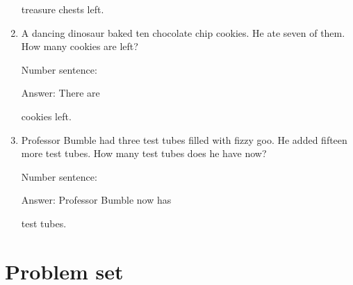 \documentclass{tufte-book}
\begin{document}
\begin{enumerate}
  treasure chests left.
\item
  A dancing dinosaur baked ten chocolate chip cookies. He ate seven of
  them. How many cookies are left?\medskip\par
  Number sentence:
  \dotfill\medskip\par
  Answer: There are
  \dotfill\medskip\par\mbox{}\dotfill\medskip\par\mbox{}\dotfill\bigskip
  cookies left.
\item
  Professor Bumble had three test tubes filled with fizzy goo. He added
  fifteen more test tubes. How many test tubes does he have now?\medskip\par
  Number sentence:
  \dotfill\medskip\par
  Answer: Professor Bumble now has
  \dotfill\medskip\par\mbox{}\dotfill\medskip\par\mbox{}\dotfill\bigskip
  test tubes.
\end{enumerate}



\clearpage\section{Problem set }
\end{document}
